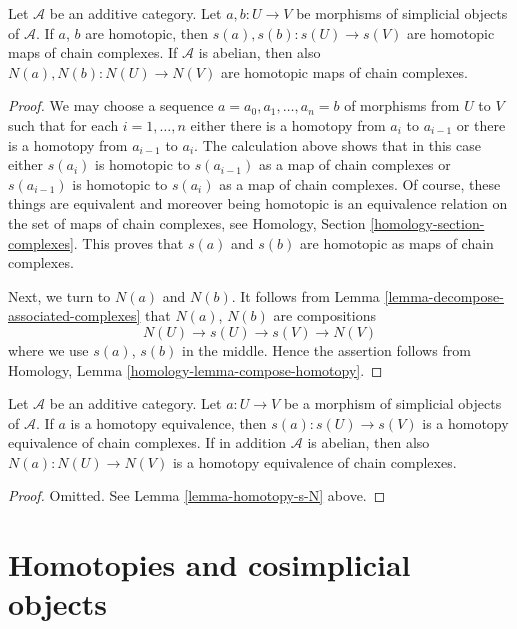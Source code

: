\begin{lemma}
\label{lemma-homotopy-s-N}
Let $\mathcal{A}$ be an additive category. Let $a, b : U \to V$ be morphisms
of simplicial objects of $\mathcal{A}$. If $a$, $b$ are homotopic,
then $s(a), s(b) : s(U) \to s(V)$ are homotopic maps of chain complexes.
If $\mathcal{A}$ is abelian, then also $N(a), N(b) : N(U) \to N(V)$ are
homotopic maps of chain complexes.
\end{lemma}

\begin{proof}
We may choose a sequence $a = a_0, a_1, \ldots, a_n = b$ of morphisms from
$U$ to $V$ such that for each $i = 1, \ldots, n$ either there is a
homotopy from $a_i$ to $a_{i - 1}$ or there is a
homotopy from $a_{i - 1}$ to $a_i$. The calculation above
shows that in this case either
$s(a_i)$ is homotopic to $s(a_{i - 1})$ as a map of chain complexes
or $s(a_{i - 1})$ is homotopic to $s(a_i)$ as a map of chain complexes.
Of course, these things are equivalent and moreover being homotopic
is an equivalence relation on the set of maps of chain complexes, see
Homology, Section \ref{homology-section-complexes}.
This proves that $s(a)$ and $s(b)$ are homotopic as maps
of chain complexes.

\medskip\noindent
Next, we turn to $N(a)$ and $N(b)$. It follows from
Lemma \ref{lemma-decompose-associated-complexes} that
$N(a)$, $N(b)$ are compositions
$$
N(U) \to s(U) \to s(V) \to N(V)
$$
where we use $s(a)$, $s(b)$ in the middle. Hence the assertion
follows from
Homology, Lemma \ref{homology-lemma-compose-homotopy}.
\end{proof}

\begin{lemma}
\label{lemma-homotopy-equivalence-s-N}
Let $\mathcal{A}$ be an additive category. Let $a : U \to V$ be a morphism
of simplicial objects of $\mathcal{A}$. If $a$ is a homotopy equivalence,
then $s(a) : s(U) \to s(V)$ is a homotopy equivalence of chain complexes.
If in addition $\mathcal{A}$ is abelian, then also
$N(a) : N(U) \to N(V)$ is a homotopy equivalence of chain complexes.
\end{lemma}

\begin{proof}
Omitted. See Lemma \ref{lemma-homotopy-s-N} above.
\end{proof}




\section{Homotopies and cosimplicial objects}
\label{section-homotopy-cosimplicial}

